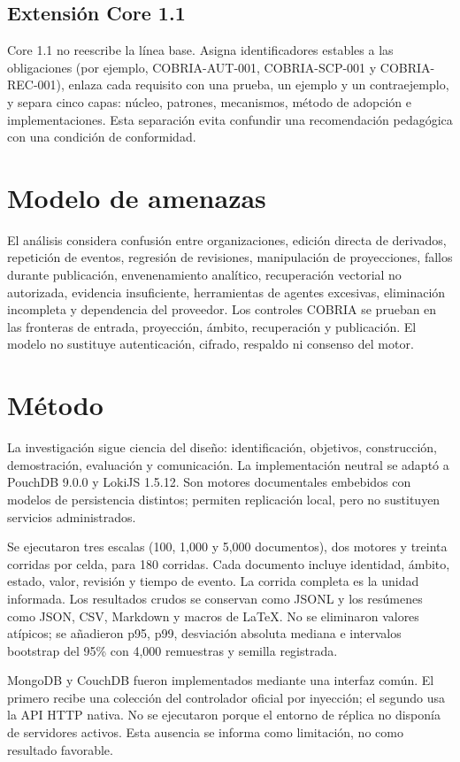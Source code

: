 \documentclass[11pt]{article}
\begin{document}
\subsection{Extensión Core 1.1}
Core 1.1 no reescribe la línea base. Asigna identificadores estables a las obligaciones (por ejemplo, COBRIA-AUT-001, COBRIA-SCP-001 y COBRIA-REC-001), enlaza cada requisito con una prueba, un ejemplo y un contraejemplo, y separa cinco capas: núcleo, patrones, mecanismos, método de adopción e implementaciones. Esta separación evita confundir una recomendación pedagógica con una condición de conformidad.

\section{Modelo de amenazas}
El análisis considera confusión entre organizaciones, edición directa de derivados, repetición de eventos, regresión de revisiones, manipulación de proyecciones, fallos durante publicación, envenenamiento analítico, recuperación vectorial no autorizada, evidencia insuficiente, herramientas de agentes excesivas, eliminación incompleta y dependencia del proveedor. Los controles COBRIA se prueban en las fronteras de entrada, proyección, ámbito, recuperación y publicación. El modelo no sustituye autenticación, cifrado, respaldo ni consenso del motor.

\section{Método}
La investigación sigue ciencia del diseño: identificación, objetivos, construcción, demostración, evaluación y comunicación. La implementación neutral se adaptó a PouchDB 9.0.0 y LokiJS 1.5.12. Son motores documentales embebidos con modelos de persistencia distintos; permiten replicación local, pero no sustituyen servicios administrados.

Se ejecutaron tres escalas (100, 1,000 y 5,000 documentos), dos motores y treinta corridas por celda, para 180 corridas. Cada documento incluye identidad, ámbito, estado, valor, revisión y tiempo de evento. La corrida completa es la unidad informada. Los resultados crudos se conservan como JSONL y los resúmenes como JSON, CSV, Markdown y macros de \LaTeX. No se eliminaron valores atípicos; se añadieron p95, p99, desviación absoluta mediana e intervalos bootstrap del 95\% con 4,000 remuestras y semilla registrada.

MongoDB y CouchDB fueron implementados mediante una interfaz común. El primero recibe una colección del controlador oficial por inyección; el segundo usa la API HTTP nativa. No se ejecutaron porque el entorno de réplica no disponía de servidores activos. Esta ausencia se informa como limitación, no como resultado favorable.
\end{document}
